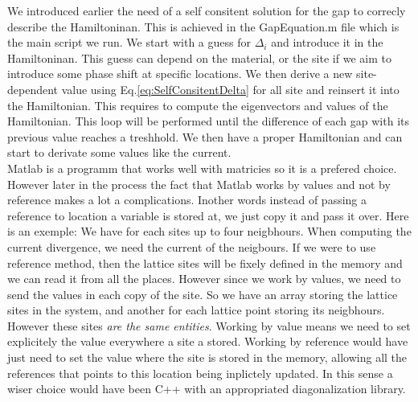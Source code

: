 \documentclass[../main.tex]{subfile}
\begin{document}
We introduced earlier the need of a self consitent solution for the gap to correcly describe the Hamiltoninan.
This is achieved in the GapEquation.m file which is the main script we run. We start with a guess for
$\Delta_i$ and introduce it in the Hamiltoninan. This guess can depend on the material, or the site 
if we aim to introduce some phase shift at specific locations.
We then derive a new site-dependent value using Eq.\ref{eq:SelfConsitentDelta} for all site and
reinsert it into the Hamiltonian. This requires to compute the eigenvectors and values of the Hamiltonian. This loop will be 
performed until the difference of each gap with its previous value reaches a treshhold. We then have a proper 
Hamiltonian and can start to derivate some values like the current. \\

Matlab is a programm that works well with matricies so it is a prefered choice. However later in the process the fact that Matlab works 
by values and not by reference makes a lot a complications. Inother words instead of passing a reference to location a variable is stored at,
we just copy it and pass it over. Here is an exemple: We have for each sites up to four neigbhours. When computing the current divergence, 
we need the current of the neigbours. If we were to use reference method, then the lattice sites will be fixely defined in the memory 
and we can read it from all the places. However since we work by values, we need to send the values in each copy of the site.
So we have an array storing the lattice sites in the system, and another for each lattice point storing its neigbhours.
However these sites \textit{are the same entities}. Working by value means we need to set explicitely the value everywhere a site a stored.
Working by reference would have just need to set the value where the site is stored in the memory,
allowing all the references that points to this location being inplictely updated. In this sense a wiser choice would have been C++
with an appropriated diagonalization library. \\
\end{document}
